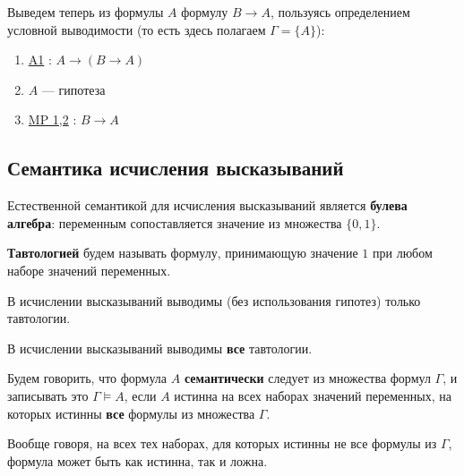 \documentclass[11pt]{article}
\begin{document}
\begin{example}
    Выведем теперь из формулы $A$ формулу $B \to A$, пользуясь определением условной выводимости (то есть здесь полагаем $\Gamma = \{A\}$):
    \begin{enumerate}
        \item \underline{\textnormal{A1}} \textnormal{:} $A \to (B \to A)$
        \item $A$ --- гипотеза
        \item \underline{\textnormal{MP 1,2}} \textnormal{:} $B \to A$
    \end{enumerate}
\end{example}

\subsection{Семантика исчисления высказываний}

Естественной семантикой для исчисления высказываний является \textbf{булева алгебра}: 
переменным сопоставляется значение из множества $\{0, 1\}$.

\begin{definition}
    \textbf{Тавтологией} будем называть формулу, принимающую значение $1$ при любом наборе значений переменных.
\end{definition}

\begin{theorem}
    В исчислении высказываний выводимы (без использования гипотез) только тавтологии.
\end{theorem}

\begin{theorem}
    В исчислении высказываний выводимы \textbf{все} тавтологии.
\end{theorem}

\begin{definition}
    Будем говорить, что формула $A$ \textbf{семантически} следует из множества формул $\Gamma$, и записывать это $\Gamma \vDash A$, если $A$ истинна 
    на всех наборах значений переменных, на которых истинны \textbf{все} формулы из множества $\Gamma$.
\end{definition}

\begin{remark}
    Вообще говоря, на всех тех наборах, для которых истинны не все формулы из $\Gamma$, формула может быть как истинна, так и ложна.
\end{remark}
\end{document}

